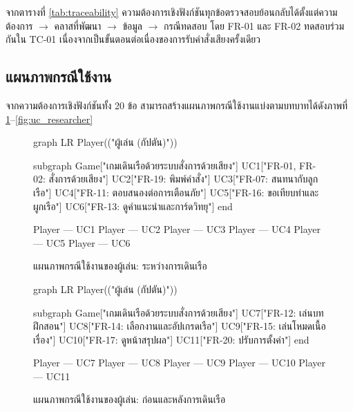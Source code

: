 จากตารางที่ \ref{tab:traceability} ความต้องการเชิงฟังก์ชันทุกข้อตรวจสอบย้อนกลับได้ตั้งแต่ความต้องการ $\rightarrow$ คลาสที่พัฒนา $\rightarrow$ ข้อมูล $\rightarrow$ กรณีทดสอบ โดย FR-01 และ FR-02 ทดสอบร่วมกันใน TC-01 เนื่องจากเป็นขั้นตอนต่อเนื่องของการรับคำสั่งเสียงครั้งเดียว

\subsection{แผนภาพกรณีใช้งาน}

จากความต้องการเชิงฟังก์ชันทั้ง 20 ข้อ สามารถสร้างแผนภาพกรณีใช้งานแบ่งตามบทบาทได้ดังภาพที่ \ref{fig:uc_player_sea}--\ref{fig:uc_researcher}


\begin{figure}[!htbp]
\centering
\begin{mermaid}
graph LR
    Player(("ผู้เล่น (กัปตัน)"))

    subgraph Game["เกมเดินเรือด้วยระบบสั่งการด้วยเสียง"]
        UC1["FR-01, FR-02: สั่งการด้วยเสียง"]
        UC2["FR-19: พิมพ์คำสั่ง"]
        UC3["FR-07: สนทนากับลูกเรือ"]
        UC4["FR-11: ตอบสนองต่อการเตือนภัย"]
        UC5["FR-16: ขอเทียบท่าและผูกเรือ"]
        UC6["FR-13: ดูคำแนะนำและการ์ดวิทยุ"]
    end

    Player --- UC1
    Player --- UC2
    Player --- UC3
    Player --- UC4
    Player --- UC5
    Player --- UC6
\end{mermaid}
\caption{แผนภาพกรณีใช้งานของผู้เล่น: ระหว่างการเดินเรือ}
\label{fig:uc_player_sea}
\end{figure}

\begin{figure}[!htbp]
\centering
\begin{mermaid}
graph LR
    Player(("ผู้เล่น (กัปตัน)"))

    subgraph Game["เกมเดินเรือด้วยระบบสั่งการด้วยเสียง"]
        UC7["FR-12: เล่นบทฝึกสอน"]
        UC8["FR-14: เลือกงานและอัปเกรดเรือ"]
        UC9["FR-15: เล่นโหมดเนื้อเรื่อง"]
        UC10["FR-17: ดูหน้าสรุปผล"]
        UC11["FR-20: ปรับการตั้งค่า"]
    end

    Player --- UC7
    Player --- UC8
    Player --- UC9
    Player --- UC10
    Player --- UC11
\end{mermaid}
\caption{แผนภาพกรณีใช้งานของผู้เล่น: ก่อนและหลังการเดินเรือ}
\label{fig:uc_player_port}
\end{figure}

